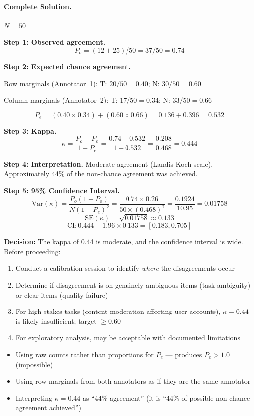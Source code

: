 \paragraph{Complete Solution.}

$N = 50$

\textbf{Step 1: Observed agreement.}
\[
P_o = (12 + 25)/50 = 37/50 = 0.74
\]

\textbf{Step 2: Expected chance agreement.}

Row marginals (Annotator~1): T: $20/50 = 0.40$; N: $30/50 = 0.60$

Column marginals (Annotator~2): T: $17/50 = 0.34$; N: $33/50 = 0.66$

\[
P_e = (0.40 \times 0.34) + (0.60 \times 0.66) = 0.136 + 0.396 = 0.532
\]

\textbf{Step 3: Kappa.}
\[
\kappa = \frac{P_o - P_e}{1 - P_e} = \frac{0.74 - 0.532}{1 - 0.532} = \frac{0.208}{0.468} = 0.444
\]

\textbf{Step 4: Interpretation.} Moderate agreement (Landis-Koch scale). Approximately 44\% of the non-chance agreement was achieved.

\textbf{Step 5: 95\% Confidence Interval.}
\[
\text{Var}(\kappa) = \frac{P_o(1-P_o)}{N(1-P_e)^2} = \frac{0.74 \times 0.26}{50 \times (0.468)^2} = \frac{0.1924}{10.95} = 0.01758
\]
\[
\text{SE}(\kappa) = \sqrt{0.01758} \approx 0.133
\]
\[
\text{CI}: 0.444 \pm 1.96 \times 0.133 = [0.183, 0.705]
\]

\textbf{Decision:} The kappa of 0.44 is moderate, and the confidence interval is wide. Before proceeding:
\begin{enumerate}
    \item Conduct a calibration session to identify \emph{where} the disagreements occur
    \item Determine if disagreement is on genuinely ambiguous items (task ambiguity) or clear items (quality failure)
    \item For high-stakes tasks (content moderation affecting user accounts), $\kappa = 0.44$ is likely insufficient; target $\geq 0.60$
    \item For exploratory analysis, may be acceptable with documented limitations
\end{enumerate}

\begin{keyconcept}
\begin{itemize}
    \item Using raw counts rather than proportions for $P_e$ --- produces $P_e > 1.0$ (impossible)
    \item Using row marginals from both annotators as if they are the same annotator
    \item Interpreting $\kappa = 0.44$ as ``44\% agreement'' (it is ``44\% of possible non-chance agreement achieved'')
\end{itemize}
\end{keyconcept}

